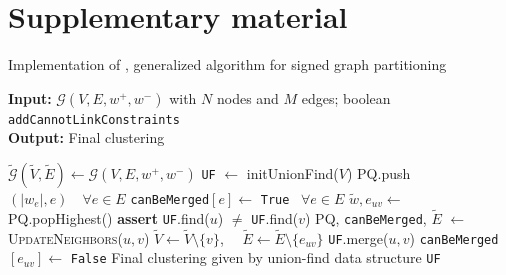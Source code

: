 
\section{Supplementary material}

\begin{algorithm}
  \caption{Implementation of \algname{}, generalized algorithm for signed graph partitioning}
\hspace*{\algorithmicindent} \textbf{Input:} $\mathcal{G}(V,E,w^+,w^-)$ with $N$ nodes and $M$ edges; boolean \texttt{{\color{blue}addCannotLinkConstraints}} \\
\hspace*{\algorithmicindent} \textbf{Output:} Final clustering \\
  \hspace*{\algorithmicindent} 
  \begin{algorithmic}[1]
      \State $\tilde{\mathcal{G}}(\tilde{V},\tilde{E}) \gets \mathcal{G}(V,E,w^+,w^-)$  
      \State \texttt{UF} $\gets$ initUnionFind($V$) 
        \State PQ.push$(|w_e|, e) \quad \forall e \in E $  
        \State \texttt{canBeMerged}$[e] \gets$ \texttt{True} $\,\,\, \forall e\in E$ 
    \State
        \State $\tilde{w}, e_{uv} \gets $ PQ.popHighest() 
        \State \textbf{assert} \texttt{UF}.find($u$) $\neq$ \texttt{UF}.find($v$) 
          \State PQ, \texttt{canBeMerged}, $\tilde{E}$ $\gets$ \textsc{UpdateNeighbors}($u,v$)
          \State $\tilde{V} \gets \tilde{V} \setminus \{ v\}$, $\quad \tilde{E} \gets \tilde{E} \setminus \{ e_{uv}\}$ 
          \State \texttt{UF}.merge($u,v$) 
          \State \texttt{canBeMerged}$[e_{uv}] \gets$ \texttt{False} 
        \EndIf
      \EndWhile
      \State
      \Return Final clustering given by union-find data structure  \texttt{UF}
  \end{algorithmic}

\end{algorithm}
